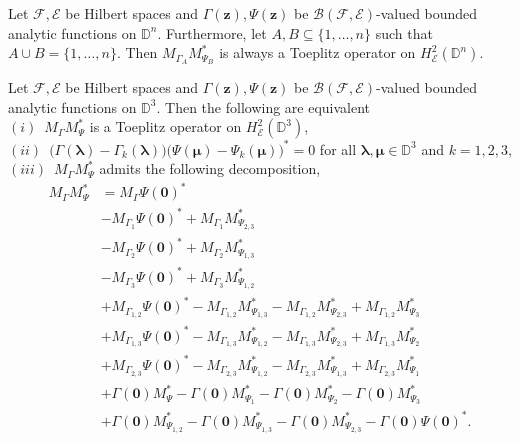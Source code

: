 \documentclass[10pt,a4paper]{amsart}
\newcommand{\D}{\mathbb{D}}
\newcommand{\clb}{\mathcal{B}}
\newcommand{\cle}{\mathcal{E}}
\newcommand{\clf}{\mathcal{F}}
\begin{document}
\begin{lemma}\label{rule}
Let $\clf, \cle$ be Hilbert spaces and $\Gamma(\bm{z}), \Psi(\bm{z})$ be $\clb(\clf,\cle)$-valued bounded analytic functions on $\D^n$.  Furthermore, let $A,B \subseteq \{1,\ldots,n\}$ such that $A \cup B = \{1,\ldots,n\}$. Then $M_{\Gamma_A} M_{\Psi_B}^*$ is always a Toeplitz operator on $H_{\cle}^2(\D^n)$.
\end{lemma}

\begin{thm}\label{tridisc}
Let $\clf, \cle$ be Hilbert spaces and $\Gamma(\bm{z}), \Psi(\bm{z})$ be $\clb(\clf,\cle)$-valued bounded analytic functions on $\D^3$. Then the following are equivalent \\ \vspace{1mm}
$(i)$~$M_{\Gamma}M_{\Psi}^*$ is a Toeplitz operator on $H_{\cle}^2(\D^3)$, \\ \vspace{1mm}
$(ii)$~$\big( \Gamma(\bm{\lambda}) - \Gamma_k(\bm{\lambda})\big) \big(  \Psi(\bm{\mu}) - \Psi_k(\bm{\mu}) \big)^* = 0$ for all $\bm{\lambda}, \bm{\mu} \in \D^3$ and $k=1,2,3$,\\ \vspace{1mm}
$(iii)$~$M_{\Gamma}M_{\Psi}^*$ admits the following decomposition, \vspace{1mm}
\begin{align*}
M_{\Gamma}M_{\Psi}^*  &=  M_{\Gamma} \Psi(\bm{0})^*\\
&-M_{\Gamma_1} \Psi(\bm{0})^* + M_{\Gamma_1} M_{\Psi_{2,3}}^*\\
&-M_{\Gamma_2} \Psi(\bm{0})^* + M_{\Gamma_2} M_{\Psi_{1,3}}^*\\
&-M_{\Gamma_3} \Psi(\bm{0})^* + M_{\Gamma_3} M_{\Psi_{1,2}}^*\\
&+M_{\Gamma_{1,2}} \Psi(\bm{0})^*  - M_{\Gamma_{1,2}} M_{\Psi_{1,3}}^* -  M_{\Gamma_{1,2}} M_{\Psi_{2,3}}^* + M_{\Gamma_{1,2}} M_{\Psi_{3}}^*\\
&+M_{\Gamma_{1,3}} \Psi(\bm{0})^*  - M_{\Gamma_{1,3}} M_{\Psi_{1,2}}^* -  M_{\Gamma_{1,3}} M_{\Psi_{2,3}}^* + M_{\Gamma_{1,3}} M_{\Psi_{2}}^*\\
&+M_{\Gamma_{2,3}} \Psi(\bm{0})^*  - M_{\Gamma_{2,3}} M_{\Psi_{1,2}}^* - M_{\Gamma_{2,3}} M_{\Psi_{1,3}}^* + M_{\Gamma_{2,3}} M_{\Psi_1}^* \\
&+\Gamma(\bm{0}) M_{\Psi}^*  - \Gamma(\bm{0}) M_{\Psi_{1}}^* -  \Gamma(\bm{0}) M_{\Psi_{2}}^* - \Gamma(\bm{0}) M_{\Psi_{3}}^*\\
&+\Gamma(\bm{0}) M_{\Psi_{1,2}}^*  - \Gamma(\bm{0}) M_{\Psi_{1,3}}^* -  \Gamma(\bm{0}) M_{\Psi_{2,3}}^* - \Gamma(\bm{0}) \Psi(\bm{0})^*.
\end{align*}
\end{thm}
\end{document}

